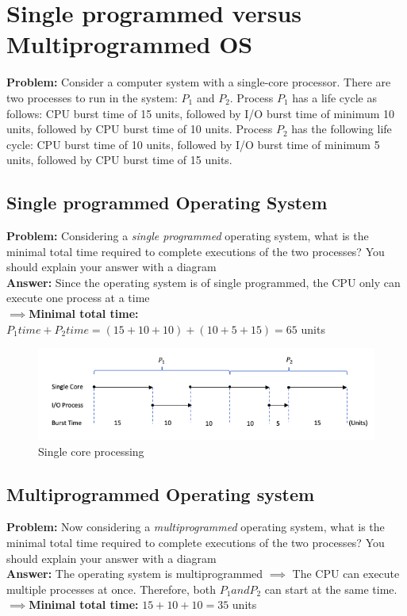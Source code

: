 \documentclass[a4paper]{article}
\begin{document}
\newpage
\section{Single programmed versus Multiprogrammed OS}
\textbf{Problem:}
Consider a computer system with a single-core processor. There are two processes to run in the system: $P_1$ and $P_2$.
Process $P_1$ has a life cycle as follows: CPU burst time of 15 units, followed by I/O burst time of minimum 10 units, followed by CPU burst time of 10 units.
Process $P_2$ has the following life cycle: CPU burst time of 10 units, followed by I/O burst time of minimum 5 units, followed by CPU burst time of 15 units.

\subsection{Single programmed Operating System}
\textbf{Problem:}
Considering a \textit{single programmed} operating system, what is the minimal total time required to complete executions of the two processes?
You should explain your answer with a diagram
\\
\textbf{Answer:}
Since the operating system is of single programmed, the CPU only can execute one process at a time\\
$\implies$\textbf{Minimal total time:} $P_1 time + P_2 time = (15 + 10 + 10) + (10 + 5 + 15) = 65$ units

\begin{figure}[ht]
    \centering
    \includegraphics[scale=0.5]{singlecoreProcess}
    \caption{Single core processing}
\end{figure}

\subsection{Multiprogrammed Operating system}
\textbf{Problem:}
Now considering a \textit{multiprogrammed} operating system, what is the minimal total time required to complete executions of the two processes?
You should explain your answer with a diagram
\\
\textbf{Answer:}
The operating system is multiprogrammed $\implies$ The CPU can execute multiple processes at once. Therefore, both $P_1 and P_2$ can start at the same time.
\\
$\implies$\textbf{Minimal total time:} $15 + 10 + 10 = 35$ units
\end{document}
